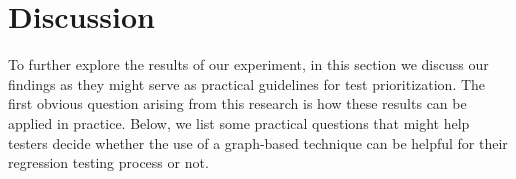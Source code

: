 \section{Discussion}
\label{sec:guidline}

To further explore the results of our experiment, in this section we discuss our findings as they might serve as practical guidelines for test prioritization. The first obvious question arising from this research is how these results can be applied in practice. Below, we list some practical questions that might help testers decide whether the use of a graph-based technique can be helpful for their regression testing process or not.

%
%	
%	
%
%

